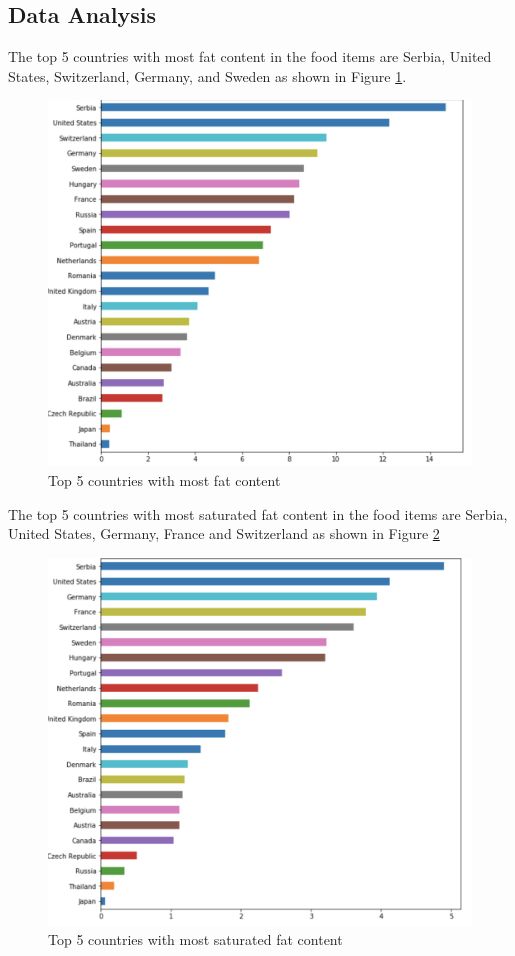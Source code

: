 \documentclass[sigconf]{acmart}
\begin{document}
\subsection{Data Analysis}
The top 5 countries with most fat content in the food items are Serbia, United States, Switzerland, Germany, and Sweden as shown in Figure \ref{fig:Fig8}.
	
\begin{figure}
\includegraphics[width=1.0\textwidth]{images/fig8.png}
\caption{Top 5 countries with most fat content \cite{code-base}}
\label{fig:Fig8}
\end{figure}

The top 5 countries with most saturated fat content in the food items are Serbia, United States, Germany, France and Switzerland as shown in Figure \ref{fig:Fig9}
	
\begin{figure}
\includegraphics[width=1.0\textwidth]{images/fig9.png}
\caption{Top 5 countries with most saturated fat content \cite{code-base}}
\label{fig:Fig9}
\end{figure}
\end{document}

